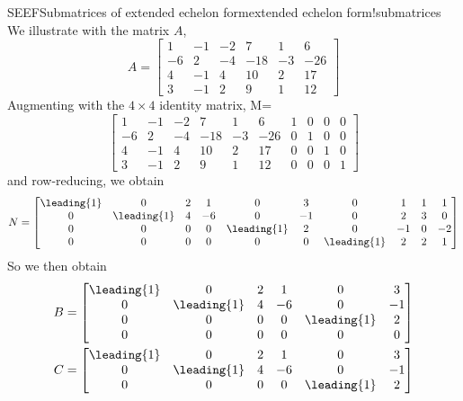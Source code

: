 \begin{example}{SEEF}{Submatrices of extended echelon form}{extended echelon form!submatrices}
We illustrate  with the matrix $A$,
%
\begin{equation*}
A=
\begin{bmatrix}
 1 & -1 & -2 & 7 & 1 & 6 \\
 -6 & 2 & -4 & -18 & -3 & -26 \\
 4 & -1 & 4 & 10 & 2 & 17 \\
 3 & -1 & 2 & 9 & 1 & 12
\end{bmatrix}
\end{equation*}
%
Augmenting with the $4\times 4$ identity matrix,
%
M=
\begin{equation*}
\begin{bmatrix}
 1 & -1 & -2 & 7 & 1 & 6 & 1 & 0 & 0 & 0 \\
 -6 & 2 & -4 & -18 & -3 & -26 & 0 & 1 & 0 & 0 \\
 4 & -1 & 4 & 10 & 2 & 17 & 0 & 0 & 1 & 0 \\
 3 & -1 & 2 & 9 & 1 & 12 & 0 & 0 & 0 & 1
\end{bmatrix}
\end{equation*}
%
and row-reducing, we obtain
%
\begin{equation*}
N=
\begin{bmatrix}
 \leading{1} & 0 & 2 & 1 & 0 & 3 & 0 & 1 & 1 & 1\\
 0 & \leading{1} & 4 & -6 & 0 & -1 & 0 & 2 & 3 & 0 \\
 0 & 0 & 0 & 0 & \leading{1} & 2 & 0 & -1 & 0 & -2 \\
 0 & 0 & 0 & 0 & 0 & 0 & \leading{1} & 2 & 2 & 1
\end{bmatrix}
\end{equation*}
%
So we then obtain
%
\begin{align*}
B&=
\begin{bmatrix}
 \leading{1} & 0 & 2 & 1 & 0 & 3 \\
 0 & \leading{1} & 4 & -6 & 0 & -1 \\
 0 & 0 & 0 & 0 & \leading{1} & 2 \\
 0 & 0 & 0 & 0 & 0 & 0
\end{bmatrix}\\
%
C&=
\begin{bmatrix}
 \leading{1} & 0 & 2 & 1 & 0 & 3 \\
 0 & \leading{1} & 4 & -6 & 0 & -1 \\
 0 & 0 & 0 & 0 & \leading{1} & 2
\end{bmatrix}\\

\end{align*}
\end{example}
